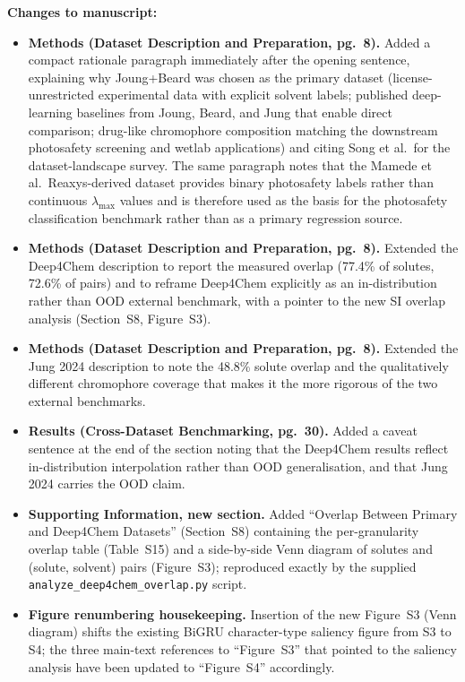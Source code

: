 \documentclass[11pt]{article}
\newenvironment{changes}{%
  \noindent\textbf{Changes to manuscript:}
  \begin{itemize}[leftmargin=2em,itemsep=2pt]}{%
  \end{itemize}\medskip}
\begin{document}
\begin{changes}
  \item \textbf{Methods (Dataset Description and Preparation, pg.\ 8).} Added a compact rationale paragraph immediately after the opening sentence, explaining why Joung+Beard was chosen as the primary dataset (license-unrestricted experimental data with explicit solvent labels; published deep-learning baselines from Joung, Beard, and Jung that enable direct comparison; drug-like chromophore composition matching the downstream photosafety screening and wetlab applications) and citing Song et al.\ for the dataset-landscape survey. The same paragraph notes that the Mamede et al.\ Reaxys-derived dataset provides binary photosafety labels rather than continuous $\lambda_{\max}$ values and is therefore used as the basis for the photosafety classification benchmark rather than as a primary regression source.
  \item \textbf{Methods (Dataset Description and Preparation, pg.\ 8).} Extended the Deep4Chem description to report the measured overlap (77.4\% of solutes, 72.6\% of pairs) and to reframe Deep4Chem explicitly as an in-distribution rather than OOD external benchmark, with a pointer to the new SI overlap analysis (Section~S8, Figure~S3).
  \item \textbf{Methods (Dataset Description and Preparation, pg.\ 8).} Extended the Jung 2024 description to note the 48.8\% solute overlap and the qualitatively different chromophore coverage that makes it the more rigorous of the two external benchmarks.
  \item \textbf{Results (Cross-Dataset Benchmarking, pg.\ 30).} Added a caveat sentence at the end of the section noting that the Deep4Chem results reflect in-distribution interpolation rather than OOD generalisation, and that Jung 2024 carries the OOD claim.
  \item \textbf{Supporting Information, new section.} Added ``Overlap Between Primary and Deep4Chem Datasets'' (Section~S8) containing the per-granularity overlap table (Table~S15) and a side-by-side Venn diagram of solutes and (solute, solvent) pairs (Figure~S3); reproduced exactly by the supplied \texttt{analyze\_deep4chem\_overlap.py} script.
  \item \textbf{Figure renumbering housekeeping.} Insertion of the new Figure~S3 (Venn diagram) shifts the existing BiGRU character-type saliency figure from S3 to S4; the three main-text references to ``Figure~S3'' that pointed to the saliency analysis have been updated to ``Figure~S4'' accordingly.
\end{changes}
\end{document}
